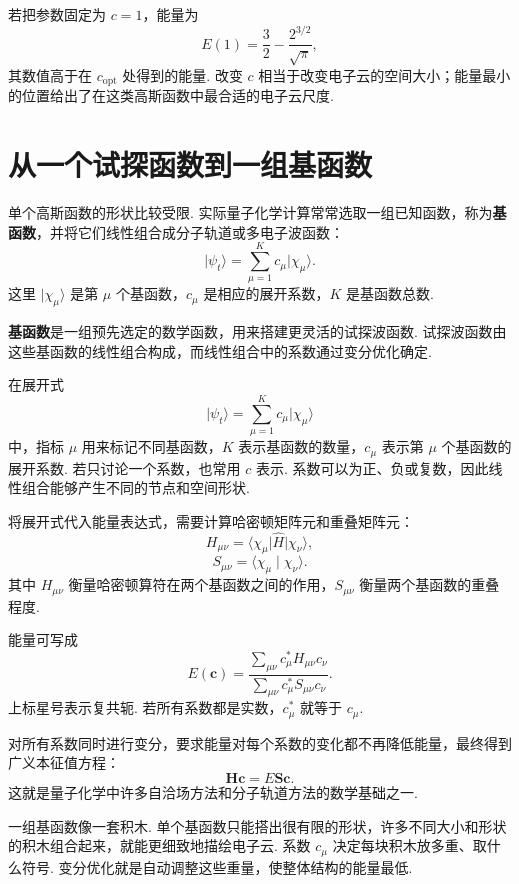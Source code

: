 \documentclass[UTF8,11pt,a4paper,openany]{ctexbook}
\newcommand{\ket}[1]{\lvert #1\rangle}\newcommand{\bra}[1]{\langle #1\rvert}
\newcommand{\braket}[2]{\langle #1\mid #2\rangle}\newcommand{\ii}{\mathrm i}
\newcommand{\term}[1]{\textbf{#1}}
\begin{document}
\begin{examplebox}
若把参数固定为 $c=1$，能量为
\[
E(1)=\frac32-\frac{2^{3/2}}{\sqrt{\pi}},
\]
其数值高于在 $c_{\mathrm{opt}}$ 处得到的能量. 改变 $c$ 相当于改变电子云的空间大小；能量最小的位置给出了在这类高斯函数中最合适的电子云尺度. 
\end{examplebox}

\section{从一个试探函数到一组基函数}

单个高斯函数的形状比较受限. 实际量子化学计算常常选取一组已知函数，称为\term{基函数}，并将它们线性组合成分子轨道或多电子波函数：
\[
\ket{\psi_t}
=
\sum_{\mu=1}^{K}c_\mu\ket{\chi_\mu}.
\]
这里 $\ket{\chi_\mu}$ 是第 $\mu$ 个基函数，$c_\mu$ 是相应的展开系数，$K$ 是基函数总数. 

\begin{definitionbox}
\term{基函数}是一组预先选定的数学函数，用来搭建更灵活的试探波函数. 试探波函数由这些基函数的线性组合构成，而线性组合中的系数通过变分优化确定. 
\end{definitionbox}

\begin{notationbox}
在展开式
\[
\ket{\psi_t}=\sum_{\mu=1}^{K}c_\mu\ket{\chi_\mu}
\]
中，指标 $\mu$ 用来标记不同基函数，$K$ 表示基函数的数量，$c_\mu$ 表示第 $\mu$ 个基函数的展开系数. 若只讨论一个系数，也常用 $c$ 表示. 系数可以为正、负或复数，因此线性组合能够产生不同的节点和空间形状. 
\end{notationbox}

将展开式代入能量表达式，需要计算哈密顿矩阵元和重叠矩阵元：
\[
H_{\mu\nu}
=
\bra{\chi_\mu}\hat H\ket{\chi_\nu},
\]
\[
S_{\mu\nu}
=
\braket{\chi_\mu}{\chi_\nu}.
\]
其中 $H_{\mu\nu}$ 衡量哈密顿算符在两个基函数之间的作用，$S_{\mu\nu}$ 衡量两个基函数的重叠程度. 

能量可写成
\[
E(\boldsymbol c)
=
\frac{
\sum_{\mu\nu}c_\mu^*H_{\mu\nu}c_\nu
}{
\sum_{\mu\nu}c_\mu^*S_{\mu\nu}c_\nu
}.
\]
上标星号表示复共轭. 若所有系数都是实数，$c_\mu^*$ 就等于 $c_\mu$. 

对所有系数同时进行变分，要求能量对每个系数的变化都不再降低能量，最终得到广义本征值方程：
\[
\boldsymbol H\boldsymbol c
=
E\boldsymbol S\boldsymbol c.
\]
这就是量子化学中许多自洽场方法和分子轨道方法的数学基础之一. 

\begin{analogybox}
一组基函数像一套积木. 单个基函数只能搭出很有限的形状，许多不同大小和形状的积木组合起来，就能更细致地描绘电子云. 系数 $c_\mu$ 决定每块积木放多重、取什么符号. 变分优化就是自动调整这些重量，使整体结构的能量最低. 
\end{analogybox}
\end{document}
